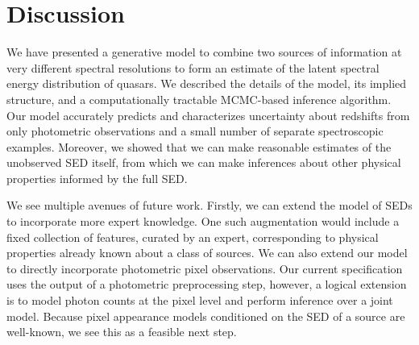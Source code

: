 \documentclass{article} %
\begin{document}

\section{Discussion}
We have presented a generative model to combine two sources of information at very different spectral resolutions to form an estimate of the latent spectral energy distribution of quasars.
We described the details of the model, its implied structure, and a computationally tractable MCMC-based inference algorithm. 
Our model accurately predicts and characterizes uncertainty about redshifts from only photometric observations and a small number of separate spectroscopic examples. 
Moreover, we showed that we can make reasonable estimates of the unobserved SED itself, from which we can make inferences about other physical properties informed by the full SED.  
 
We see multiple avenues of future work.
Firstly, we can extend the model of SEDs to incorporate more expert knowledge.
One such augmentation would include a fixed collection of features, curated by an expert, corresponding to physical properties already known about a class of sources.  
We can also extend our model to directly incorporate photometric pixel observations.
Our current specification uses the output of a photometric preprocessing step, however, a logical extension is to model photon counts at the pixel level and perform inference over a joint model. 
Because pixel appearance models conditioned on the SED of a source are well-known, we see this as a feasible next step. 
\end{document}
